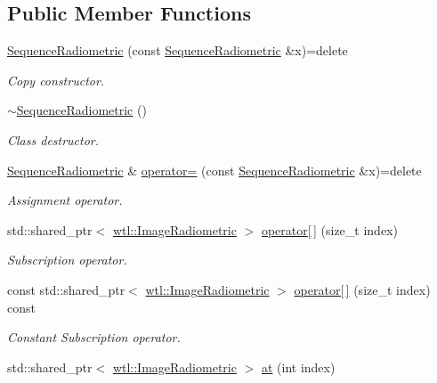 \subsection*{Public Member Functions}
\begin{DoxyCompactItemize}
\item 
\hyperlink{classwtl_1_1_sequence_radiometric_a2cc32b5a5bad40a78f78aa1388b98fff}{Sequence\+Radiometric} (const \hyperlink{classwtl_1_1_sequence_radiometric}{Sequence\+Radiometric} \&x)=delete
\begin{DoxyCompactList}\small\item\em Copy constructor. \end{DoxyCompactList}\item 
\hyperlink{classwtl_1_1_sequence_radiometric_a0512cf0918f1fcc9ce2d6d23bb3db3ef}{$\sim$\+Sequence\+Radiometric} ()
\begin{DoxyCompactList}\small\item\em Class destructor. \end{DoxyCompactList}\item 
\hyperlink{classwtl_1_1_sequence_radiometric}{Sequence\+Radiometric} \& \hyperlink{classwtl_1_1_sequence_radiometric_ae322c5199985048182697285611c0958}{operator=} (const \hyperlink{classwtl_1_1_sequence_radiometric}{Sequence\+Radiometric} \&x)=delete
\begin{DoxyCompactList}\small\item\em Assignment operator. \end{DoxyCompactList}\item 
std\+::shared\+\_\+ptr$<$ \hyperlink{classwtl_1_1_image_radiometric}{wtl\+::\+Image\+Radiometric} $>$ \hyperlink{classwtl_1_1_sequence_radiometric_a89c1f04092c4b14814693c95b753bbc3}{operator\mbox{[}$\,$\mbox{]}} (size\+\_\+t index)
\begin{DoxyCompactList}\small\item\em Subscription operator. \end{DoxyCompactList}\item 
const std\+::shared\+\_\+ptr$<$ \hyperlink{classwtl_1_1_image_radiometric}{wtl\+::\+Image\+Radiometric} $>$ \hyperlink{classwtl_1_1_sequence_radiometric_afb8a7fd35e6c4b10406953a12c4564fe}{operator\mbox{[}$\,$\mbox{]}} (size\+\_\+t index) const
\begin{DoxyCompactList}\small\item\em Constant Subscription operator. \end{DoxyCompactList}\item 
std\+::shared\+\_\+ptr$<$ \hyperlink{classwtl_1_1_image_radiometric}{wtl\+::\+Image\+Radiometric} $>$ \hyperlink{classwtl_1_1_sequence_radiometric_acff97bda5576bfb082cc5708c9a35200}{at} (int index)

\end{DoxyCompactItemize}
